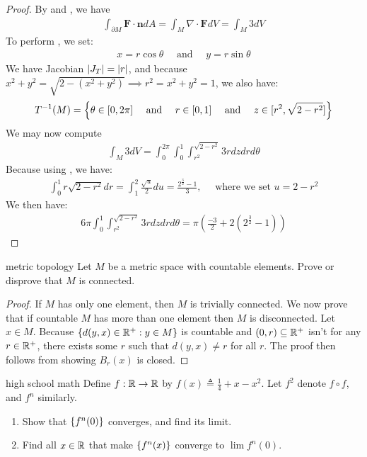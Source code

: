 \documentclass{report}
\begin{document}
\begin{proof}
By  and , we have 
\begin{align*}
\int_{\partial M} \textbf{F}\cdot \textbf{n}d A = \int_M \nabla \cdot \textbf{F} dV = \int_M 3 dV  
\end{align*}
To perform , we set:  
\begin{align*}
x=r \cos \theta \quad \text{ and }\quad y=r \sin \theta
\end{align*}
We have Jacobian $\left|J_T\right|=\left|r\right|$, and because $x^2+y^2 = \sqrt{2- (x^2+y^2)} \implies  r^2=x^2+y^2=1$, we also have: 
 \begin{align*}
T^{-1}(M) = \left\{ \theta \in [0,2\pi ]\quad \text{ and }\quad r\in [0,1]\quad\text{ and }\quad  z \in [r^2, \sqrt{2-r^2} ]   \right\} 
\end{align*}
We may now compute
\begin{align*}
\int_M 3 dV= \int_{0}^{2\pi }  \int_{0}^1 \int_{r^2}^{\sqrt{2-r^2} } 3r dzdrd\theta
\end{align*}
Because using , we have:  
\begin{align*}
  \int_0^1 r \sqrt{2-r^2}  dr =\int^{2}_{1} \frac{\sqrt{u}}{2}du = \frac{2^{\frac{3}{2}}-1}{3},\quad \text{ where we set } u= 2-r^2 
\end{align*}
We then have: 
\begin{align*}
6 \pi \int_{0}^1 \int_{r^2}^{\sqrt{2-r^2} } 3r dzdrd\theta = \pi  \left( \frac{-3}{2}+2 \left(2^{\frac{3}{2}} -1\right) \right)
\end{align*}
\end{proof}
\begin{question}{metric topology}{}
Let $M$ be a metric space with countable elements. Prove or disprove that $M$ is connected. 
\end{question}
\begin{proof}
If $M$ has only one element, then  $M$ is trivially connected. We now prove that if  countable $M$ has more than one element then  $M$ is disconnected. Let $x\in M$. Because $\left\{ d(y,x)\in\mathbb{R}^+: y \in M \right\}$ is countable and $(0,r)\subseteq \mathbb{R}^+$ isn't for any $r\in\mathbb{R}^+$,  there exists some  $r$ such that $d(y,x)\neq r$ for all $r$. The proof then follows from showing $B_r(x)$ is closed.  
\end{proof}
\begin{question}{high school math}{}
Define $f:\mathbb{R}\rightarrow \mathbb{R}$ by $f(x)\triangleq \frac{1}{4}+x-x^2$. Let $f^2$ denote  $f \circ f$, and $f^n$ similarly.  
\begin{enumerate}[label=(\roman*)]
  \item Show that $\left\{ f^n(0) \right\}$ converges, and find its limit. 
  \item Find all $x\in\mathbb{R}$ that make $\left\{ f^n(x) \right\}$ converge to $\lim f^n(0)$. 
\end{enumerate}
\end{question}
\end{document}
